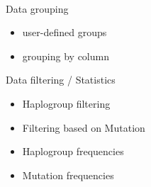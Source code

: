\documentclass[a0paper,portrait]{baposter}
\begin{document}
\begin{poster}
{\\
\begin{minipage}{0.5\textwidth}
Data grouping
\begin{itemize}
	\item user-defined groups
	\item grouping by column
\end{itemize}
\end{minipage}
\begin{minipage}{0.5\textwidth}
Data filtering / Statistics
\begin{itemize}
	\item Haplogroup filtering
	\item Filtering based on Mutation
	\item Haplogroup frequencies
	\item Mutation frequencies
\end{itemize}
\end{minipage}
}






\end{poster}
\end{document}
